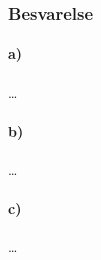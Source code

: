 \documentclass[../main.tex]{subfiles}
\begin{document}

\subsubsection{Besvarelse}


\paragraph{a)}

\ldots



\paragraph{b)}

\ldots



\paragraph{c)}

\ldots



\end{document}
